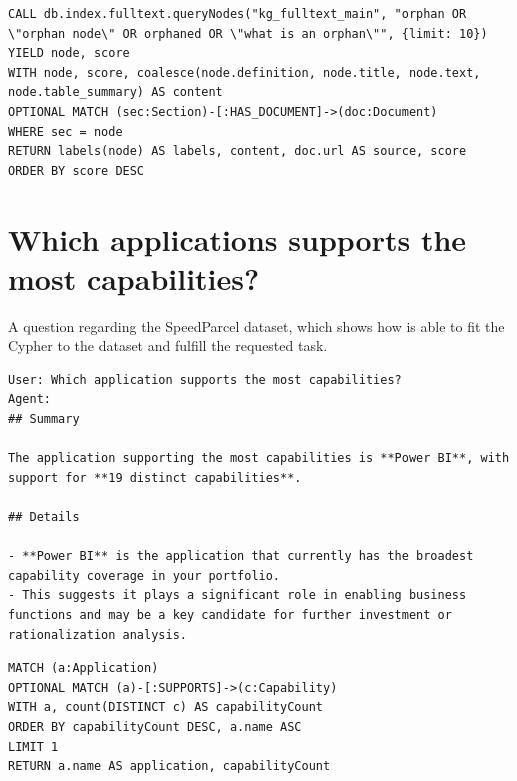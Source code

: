 \begin{lstlisting}[style=cypherstyle, label={lst:cWhatIsAnOrphan},caption={The Cypher used to query textbook information containing the keyword "orphan".}]
CALL db.index.fulltext.queryNodes("kg_fulltext_main", "orphan OR \"orphan node\" OR orphaned OR \"what is an orphan\"", {limit: 10}) YIELD node, score
WITH node, score, coalesce(node.definition, node.title, node.text, node.table_summary) AS content
OPTIONAL MATCH (sec:Section)-[:HAS_DOCUMENT]->(doc:Document)
WHERE sec = node
RETURN labels(node) AS labels, content, doc.url AS source, score
ORDER BY score DESC
\end{lstlisting}

\section{Which applications supports the most capabilities?}
\label{appendix:code:whatIsAnOrphan}
A question regarding the SpeedParcel dataset, which shows how \prototype{} is able to fit the Cypher to the dataset and fulfill the requested task.

\begin{lstlisting}[style=cypherstyle, label={lst:qWhichApplication},caption={Asking \prototype{} which application in SpeedParcel's dataset supports the most capabilities.}]
User: Which application supports the most capabilities?
Agent:
## Summary

The application supporting the most capabilities is **Power BI**, with support for **19 distinct capabilities**.

## Details

- **Power BI** is the application that currently has the broadest capability coverage in your portfolio.
- This suggests it plays a significant role in enabling business functions and may be a key candidate for further investment or rationalization analysis.
\end{lstlisting}

\begin{lstlisting}[style=cypherstyle, label={lst:cWhichApplication},caption={The Cypher used to count the amount of capabilities an application supports".}]
MATCH (a:Application)
OPTIONAL MATCH (a)-[:SUPPORTS]->(c:Capability)
WITH a, count(DISTINCT c) AS capabilityCount
ORDER BY capabilityCount DESC, a.name ASC
LIMIT 1
RETURN a.name AS application, capabilityCount
\end{lstlisting}